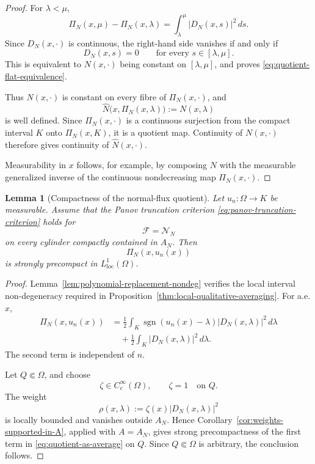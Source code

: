 \documentclass[11pt]{amsart}
\numberwithin{equation}{section}
\theoremstyle{plain}
\newtheorem{lemma}[theorem]{Lemma}
\theoremstyle{definition}
\theoremstyle{remark}
\begin{document}
\begin{proof}
For \(\lambda<\mu\),
\begin{equation}
\label{eq:quotient-increment}
    \Pi_N(x,\mu)-\Pi_N(x,\lambda)
    =
    \int_\lambda^\mu
        |D_N(x,s)|^2\,ds.
\end{equation}
Since \(D_N(x,\cdot)\) is continuous, the right-hand side vanishes if and
only if
\[
    D_N(x,s)=0
    \qquad
    \text{for every }s\in[\lambda,\mu].
\]
This is equivalent to \(N(x,\cdot)\) being constant on
\([\lambda,\mu]\), and proves
\eqref{eq:quotient-flat-equivalence}.

Thus \(N(x,\cdot)\) is constant on every fibre of
\(\Pi_N(x,\cdot)\), and
\[
    \widehat N
    \bigl(x,\Pi_N(x,\lambda)\bigr)
    :=
    N(x,\lambda)
\]
is well defined.  Since \(\Pi_N(x,\cdot)\) is a continuous surjection from
the compact interval \(K\) onto \(\Pi_N(x,K)\), it is a quotient map.
Continuity of \(N(x,\cdot)\) therefore gives continuity of
\(\widehat N(x,\cdot)\).

Measurability in \(x\) follows, for example, by composing \(N\) with the
measurable generalized inverse of the continuous nondecreasing map
\(\Pi_N(x,\cdot)\).
\end{proof}

\begin{lemma}[Compactness of the normal-flux quotient]
\label{lem:compactness-normal-flux-quotient}
Let \(u_n:\Omega\to K\) be measurable.  Assume that the Panov truncation
criterion
\eqref{eq:panov-truncation-criterion} holds for
\[
    \mathcal F=\mathcal N_N
\]
on every cylinder compactly contained in \(A_N\).  Then
\[
    \Pi_N(x,u_n(x))
\]
is strongly precompact in \(L^1_{\mathrm{loc}}(\Omega)\).
\end{lemma}

\begin{proof}
Lemma~\ref{lem:polynomial-replacement-nondeg} verifies the local interval
non-degeneracy required in
Proposition~\ref{thm:local-qualitative-averaging}.  For a.e. \(x\),
\begin{equation}
\label{eq:quotient-as-average}
\begin{aligned}
    \Pi_N(x,u_n(x))
    &=
    \frac12
    \int_K
        \operatorname{sgn}(u_n(x)-\lambda)
        |D_N(x,\lambda)|^2\,d\lambda
\\
    &\quad+
    \frac12
    \int_K
        |D_N(x,\lambda)|^2\,d\lambda.
\end{aligned}
\end{equation}
The second term is independent of \(n\).

Let \(Q\Subset\Omega\), and choose
\[
    \zeta\in C_c^\infty(\Omega),
    \qquad
    \zeta=1
    \quad\text{on }Q.
\]
The weight
\[
    \rho(x,\lambda)
    :=
    \zeta(x)|D_N(x,\lambda)|^2
\]
is locally bounded and vanishes outside \(A_N\).  Hence
Corollary~\ref{cor:weights-supported-in-A}, applied with \(A=A_N\), gives
strong precompactness of the first term in
\eqref{eq:quotient-as-average} on \(Q\).  Since \(Q\Subset\Omega\) is
arbitrary, the conclusion follows.
\end{proof}
\end{document}
